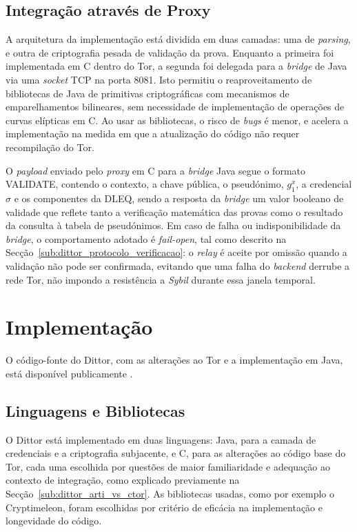 \subsection{Integração através de Proxy}
\label{sub:dittor_integracao_proxy}

A arquitetura da implementação está dividida em duas camadas: uma de \textit{parsing}, e outra de criptografia pesada de validação da prova. Enquanto a primeira foi implementada em C dentro do Tor, a segunda foi delegada para a \textit{bridge} de Java via uma \textit{socket} TCP na porta 8081. Isto permitiu o reaproveitamento de bibliotecas de Java de primitivas criptográficas com mecanismos de emparelhamentos bilineares, sem necessidade de implementação de operações de curvas elípticas em C. Ao usar as bibliotecas, o risco de \textit{bugs} é menor, e acelera a implementação na medida em que a atualização do código não requer recompilação do Tor.

O \textit{payload} enviado pelo \textit{proxy} em C para a \textit{bridge} Java segue o formato VALIDATE, contendo o contexto, a chave pública, o pseudónimo, $g_1^x$, a credencial $\sigma$ e os componentes da DLEQ, sendo a resposta da \textit{bridge} um valor booleano de validade que reflete tanto a verificação matemática das provas como o resultado da consulta à tabela de pseudónimos. Em caso de falha ou indisponibilidade da \textit{bridge}, o comportamento adotado é \textit{fail-open}, tal como descrito na Secção~\ref{sub:dittor_protocolo_verificacao}: o \textit{relay} é aceite por omissão quando a validação não pode ser confirmada, evitando que uma falha do \textit{backend} derrube a rede Tor, não impondo a resistência a \textit{Sybil} durante essa janela temporal.

\section{Implementação}
\label{sec:dittor_implementacao}

O código-fonte do Dittor, com as alterações ao Tor e a implementação em Java, está disponível publicamente \cite{dittor_github}.

\subsection{Linguagens e Bibliotecas}
\label{sub:dittor_impl_linguagens}

O Dittor está implementado em duas linguagens: Java, para a camada de credenciais e a criptografia subjacente, e C, para as alterações ao código base do Tor, cada uma escolhida por questões de maior familiaridade e adequação ao contexto de integração, como explicado previamente na Secção~\ref{sub:dittor_arti_vs_ctor}. As bibliotecas usadas, como por exemplo o Cryptimeleon, foram escolhidas por critério de eficácia na implementação e longevidade do código.


